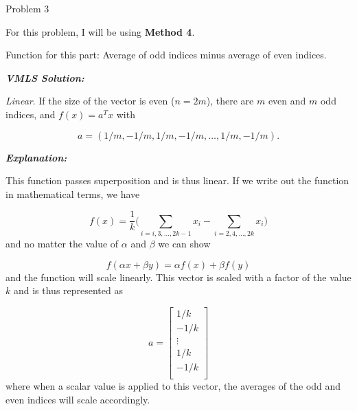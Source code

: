\begin{problem}{Problem 3}
    \begin{highlight}
        For this problem, I will be using \textbf{Method 4}. \vspace*{1em}

        Function for this part: Average of odd indices minus average of even indices. \vspace*{1em}

        \textbf{\textit{VMLS Solution:}} \vspace*{1em}

        \textit{Linear}. If the size of the vector is even ($n = 2m$), there are $m$ even and $m$ odd indices, and $f(x) = a^{T}x$ with

        \begin{equation}
            a = (1/m, -1/m, 1/m, -1/m, \dots, 1/m, -1/m).
        \end{equation}

        \textbf{\textit{Explanation:}} \vspace*{1em}

        This function passes superposition and is thus linear. If we write out the function in mathematical terms, we have

        \begin{equation}
            f(x) = \frac{1}{k} \Bigg(\sum_{i = i,3,\dots, 2k-1} x_{i} - \sum_{i = 2,4,\dots, 2k} x_{i}\Bigg)
        \end{equation}
        and no matter the value of $\alpha$ and $\beta$ we can show

        \begin{equation}
            f(\alpha x + \beta y) = \alpha f(x) + \beta f(y)
        \end{equation}
        and the function will scale linearly. This vector is scaled with a factor of the value $k$ and is thus represented as

        \begin{equation}
            a = 
            \begin{bmatrix}
                1/k \\
                -1/k \\
                \vdots \\
                1/k \\
                -1/k \\
            \end{bmatrix}
        \end{equation}
        where when a scalar value is applied to this vector, the averages of the odd and even indices will scale accordingly.
    \end{highlight}


\end{problem}
